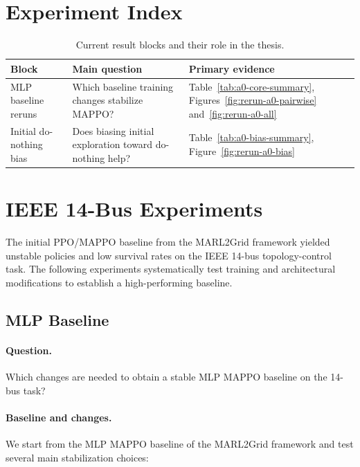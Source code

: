 \section{Experiment Index}
\label{sec:results-experiment-index}

\begin{table}[H]
  \centering
  \small
  \caption{Current result blocks and their role in the thesis.}
  \label{tab:experiment-index}
  \setlength{\tabcolsep}{4pt}
  \begin{tabular}{L{0.2\textwidth}L{0.37\textwidth}L{0.36\textwidth}}
    \toprule
    Block & Main question & Primary evidence \\
    \midrule
    MLP baseline reruns & Which baseline training changes stabilize MAPPO? &
    Table~\ref{tab:a0-core-summary}, Figures~\ref{fig:rerun-a0-pairwise}
    and~\ref{fig:rerun-a0-all} \\
    Initial do-nothing bias & Does biasing initial exploration toward do-nothing help? &
    Table~\ref{tab:a0-bias-summary}, Figure~\ref{fig:rerun-a0-bias} \\
    \bottomrule
  \end{tabular}
\end{table}

\section{IEEE 14-Bus Experiments}
\label{sec:bus14-results}

The initial PPO/MAPPO baseline from the MARL2Grid framework yielded unstable policies and low survival rates on the IEEE 14-bus topology-control task. The following experiments systematically test training and architectural modifications to establish a high-performing baseline.

\subsection{MLP Baseline}
\label{subsec:a0-core-reruns}

\paragraph{Question.}
Which changes are needed to obtain a stable MLP MAPPO baseline on the 14-bus
task?

\paragraph{Baseline and changes.}
We start from the MLP MAPPO baseline of the MARL2Grid framework and test several main
stabilization choices:


